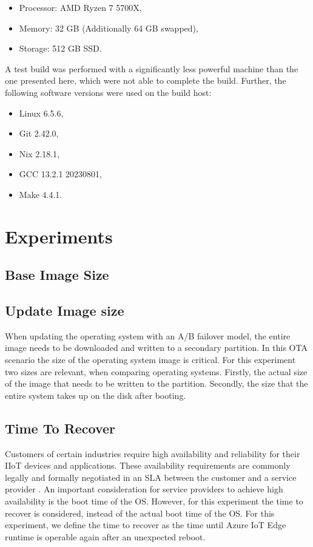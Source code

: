 \begin{itemize}
    \item Processor: AMD Ryzen 7 5700X,
    \item Memory: 32 GB (Additionally 64 GB swapped),
    \item Storage: 512 GB SSD.
\end{itemize}

\noindent
A test build was performed with a significantly less powerful machine than the
one presented here, which were not able to complete the build.
Further, the following software versions were used on the build host:
\begin{itemize}
    \item Linux 6.5.6,
    \item Git 2.42.0,
    \item Nix 2.18.1,
    \item GCC 13.2.1 20230801,
    \item Make 4.4.1.
\end{itemize}

\section{Experiments}

\subsection{Base Image Size}

\clearpage
\subsection{Update Image size}
\label{sec:update-image}
When updating the operating system with an A/B failover model, the entire
image needs to be downloaded and written to a secondary partition. In this
\ac{OTA} scenario the size of the operating system image is critical.
For this experiment two sizes are relevant, when comparing operating systems.
Firstly, the actual size of the image that needs to be written to the partition.
Secondly, the size that the entire system takes up on the disk after booting.

\clearpage
\subsection{Time To Recover}
Customers of certain industries require high availability and reliability for
their \ac{IIoT} devices and applications. These availability requirements
are commonly legally and formally negotiated in an \ac{SLA} between
the customer and a service provider \cite{msdoc-slas}. An important consideration
for service providers to achieve high availability is the boot time of the
\ac{OS}. However, for this experiment the time to recover is considered,
instead of the actual boot time of the \ac{OS}. For this experiment, we define the
time to recover as the time until Azure IoT Edge runtime is operable again after
an unexpected reboot.

